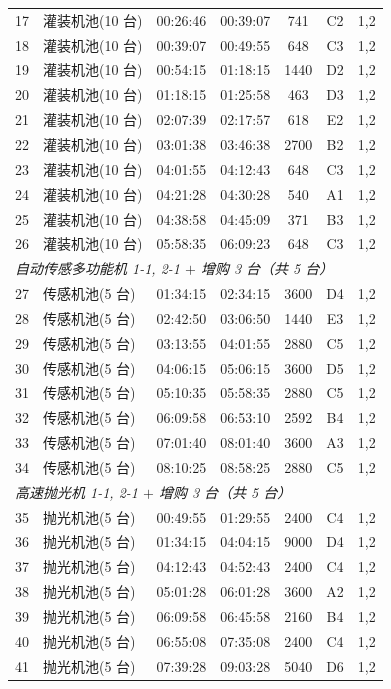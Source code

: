 \documentclass[12pt,a4paper]{ctexart}
\begin{document}
\begin{longtable}{c p{4.2cm} c c c c c}
17 & 灌装机池(10 台) & 00:26:46 & 00:39:07 & 741 & C2 & 1,2 \\
18 & 灌装机池(10 台) & 00:39:07 & 00:49:55 & 648 & C3 & 1,2 \\
19 & 灌装机池(10 台) & 00:54:15 & 01:18:15 & 1440 & D2 & 1,2 \\
20 & 灌装机池(10 台) & 01:18:15 & 01:25:58 & 463 & D3 & 1,2 \\
21 & 灌装机池(10 台) & 02:07:39 & 02:17:57 & 618 & E2 & 1,2 \\
22 & 灌装机池(10 台) & 03:01:38 & 03:46:38 & 2700 & B2 & 1,2 \\
23 & 灌装机池(10 台) & 04:01:55 & 04:12:43 & 648 & C3 & 1,2 \\
24 & 灌装机池(10 台) & 04:21:28 & 04:30:28 & 540 & A1 & 1,2 \\
25 & 灌装机池(10 台) & 04:38:58 & 04:45:09 & 371 & B3 & 1,2 \\
26 & 灌装机池(10 台) & 05:58:35 & 06:09:23 & 648 & C3 & 1,2 \\
\midrule
\multicolumn{7}{l}{\textit{自动传感多功能机 1-1, 2-1 $+$ 增购 3 台（共 5 台）}}\\
27 & 传感机池(5 台) & 01:34:15 & 02:34:15 & 3600 & D4 & 1,2 \\
28 & 传感机池(5 台) & 02:42:50 & 03:06:50 & 1440 & E3 & 1,2 \\
29 & 传感机池(5 台) & 03:13:55 & 04:01:55 & 2880 & C5 & 1,2 \\
30 & 传感机池(5 台) & 04:06:15 & 05:06:15 & 3600 & D5 & 1,2 \\
31 & 传感机池(5 台) & 05:10:35 & 05:58:35 & 2880 & C5 & 1,2 \\
32 & 传感机池(5 台) & 06:09:58 & 06:53:10 & 2592 & B4 & 1,2 \\
33 & 传感机池(5 台) & 07:01:40 & 08:01:40 & 3600 & A3 & 1,2 \\
34 & 传感机池(5 台) & 08:10:25 & 08:58:25 & 2880 & C5 & 1,2 \\
\midrule
\multicolumn{7}{l}{\textit{高速抛光机 1-1, 2-1 $+$ 增购 3 台（共 5 台）}}\\
35 & 抛光机池(5 台) & 00:49:55 & 01:29:55 & 2400 & C4 & 1,2 \\
36 & 抛光机池(5 台) & 01:34:15 & 04:04:15 & 9000 & D4 & 1,2 \\
37 & 抛光机池(5 台) & 04:12:43 & 04:52:43 & 2400 & C4 & 1,2 \\
38 & 抛光机池(5 台) & 05:01:28 & 06:01:28 & 3600 & A2 & 1,2 \\
39 & 抛光机池(5 台) & 06:09:58 & 06:45:58 & 2160 & B4 & 1,2 \\
40 & 抛光机池(5 台) & 06:55:08 & 07:35:08 & 2400 & C4 & 1,2 \\
41 & 抛光机池(5 台) & 07:39:28 & 09:03:28 & 5040 & D6 & 1,2 \\
\end{longtable}
\end{document}
